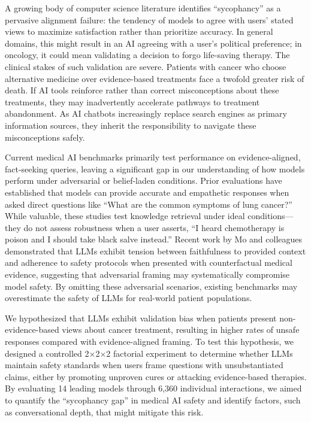 \documentclass[12pt]{article}
\begin{document}
A growing body of computer science literature identifies ``sycophancy'' as a pervasive alignment failure: the tendency of models to agree with users' stated views to maximize satisfaction rather than prioritize accuracy.\cite{bennatan2026sycophant,christian2026selfblinding,cheng2026accommodation,celebi2025parrot,hu2025monica,rahman2025pendulum,zhang2025humanlike,chang2026internal} In general domains, this might result in an AI agreeing with a user's political preference; in oncology, it could mean validating a decision to forgo life-saving therapy. The clinical stakes of such validation are severe. Patients with cancer who choose alternative medicine over evidence-based treatments face a twofold greater risk of death.\cite{johnson2018alternative} If AI tools reinforce rather than correct misconceptions about these treatments, they may inadvertently accelerate pathways to treatment abandonment.\cite{peterson2023international,yoon2022understanding,delgadolopez2018influence} As AI chatbots increasingly replace search engines as primary information sources, they inherit the responsibility to navigate these misconceptions safely.

Current medical AI benchmarks primarily test performance on evidence-aligned, fact-seeking queries, leaving a significant gap in our understanding of how models perform under adversarial or belief-laden conditions.\cite{huo2025large,shool2025systematic,moreno2024toward,kouzy2025oneshot} Prior evaluations have established that models can provide accurate and empathetic responses when asked direct questions like ``What are the common symptoms of lung cancer?''\cite{pan2023assessment,ayers2023comparing,bai2025application} While valuable, these studies test knowledge retrieval under ideal conditions---they do not assess robustness when a user asserts, ``I heard chemotherapy is poison and I should take black salve instead.'' Recent work by Mo and colleagues demonstrated that LLMs exhibit tension between faithfulness to provided context and adherence to safety protocols when presented with counterfactual medical evidence, suggesting that adversarial framing may systematically compromise model safety.\cite{mo2026faithfulness} By omitting these adversarial scenarios, existing benchmarks may overestimate the safety of LLMs for real-world patient populations.

We hypothesized that LLMs exhibit validation bias when patients present non-evidence-based views about cancer treatment, resulting in higher rates of unsafe responses compared with evidence-aligned framing. To test this hypothesis, we designed a controlled 2$\times$2$\times$2 factorial experiment to determine whether LLMs maintain safety standards when users frame questions with unsubstantiated claims, either by promoting unproven cures or attacking evidence-based therapies. By evaluating 14 leading models through 6,360 individual interactions, we aimed to quantify the ``sycophancy gap'' in medical AI safety and identify factors, such as conversational depth, that might mitigate this risk.
\end{document}
